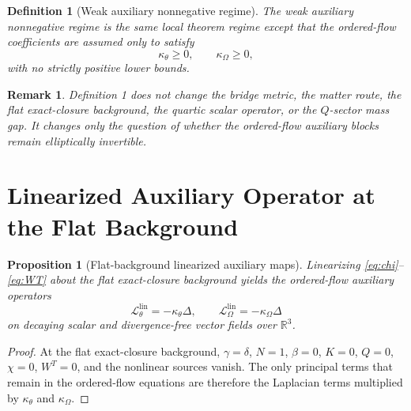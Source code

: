 \documentclass[11pt]{article}
\newtheorem{definition}{Definition}
\newtheorem{proposition}{Proposition}
\newtheorem{remark}{Remark}
\begin{document}
\begin{definition}[Weak auxiliary nonnegative regime]
The \emph{weak auxiliary nonnegative regime} is the same local theorem regime except that the ordered-flow coefficients are assumed only to satisfy
\begin{equation}
\kappa_\theta\ge 0,
\qquad
\kappa_\Omega\ge 0,
\label{eq:weakcoeff}
\end{equation}
with no strictly positive lower bounds.
\end{definition}

\begin{remark}
Definition 1 does not change the bridge metric, the matter route, the flat exact-closure background, the quartic scalar operator, or the \(Q\)-sector mass gap. It changes only the question of whether the ordered-flow auxiliary blocks remain elliptically invertible.
\end{remark}

\section{Linearized Auxiliary Operator at the Flat Background}

\begin{proposition}[Flat-background linearized auxiliary maps]
Linearizing \eqref{eq:chi}--\eqref{eq:WT} about the flat exact-closure background yields the ordered-flow auxiliary operators
\begin{equation}
\mathcal L_\theta^{\mathrm{lin}}=-\kappa_\theta\Delta,
\qquad
\mathcal L_\Omega^{\mathrm{lin}}=-\kappa_\Omega\Delta
\label{eq:linops}
\end{equation}
on decaying scalar and divergence-free vector fields over \(\mathbb R^3\).
\end{proposition}

\begin{proof}
At the flat exact-closure background, \(\gamma=\delta\), \(N=1\), \(\beta=0\), \(K=0\), \(Q=0\), \(\chi=0\), \(W^T=0\), and the nonlinear sources vanish. The only principal terms that remain in the ordered-flow equations are therefore the Laplacian terms multiplied by \(\kappa_\theta\) and \(\kappa_\Omega\).
\end{proof}
\end{document}
